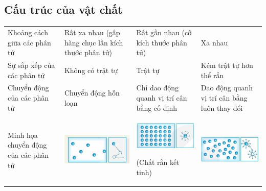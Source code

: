 \subsection{Cấu trúc của vật chất}
\begin{center}
	\begin{tabular}{|L{4cm}|L{4cm}|L{4cm}|L{4cm}|}
		\hline
		&& &\\
		\hline
		Khoảng cách giữa các phân tử & Rất xa nhau (gấp hàng chục lần kích thước phân tử) & Rất gần nhau (cỡ kích thước phân tử) & Xa nhau\\
		\hline
		Sự sắp xếp của các phân tử & 	Không có trật tự & Trật tự & Kém trật tự hơn thể rắn\\
		\hline
		Chuyển động của các phân tử & Chuyển động hỗn loạn & Chỉ dao động quanh vị trí cân bằng cố định & Dao động quanh vị trí cân bằng luôn thay đổi\\
		\hline
		Minh họa chuyển động của các phân tử & \begin{center}
			\includegraphics[width=0.8\linewidth]{../figs/G12C1-1}
		\end{center}&\begin{center}
		\includegraphics[width=0.8\linewidth]{../figs/G12C1-2}
		\end{center}(Chất rắn kết tinh) &\begin{center}
		\includegraphics[width=0.8\linewidth]{../figs/G12C1-3}
		\end{center}\\
		\hline
	\end{tabular}
\end{center}
